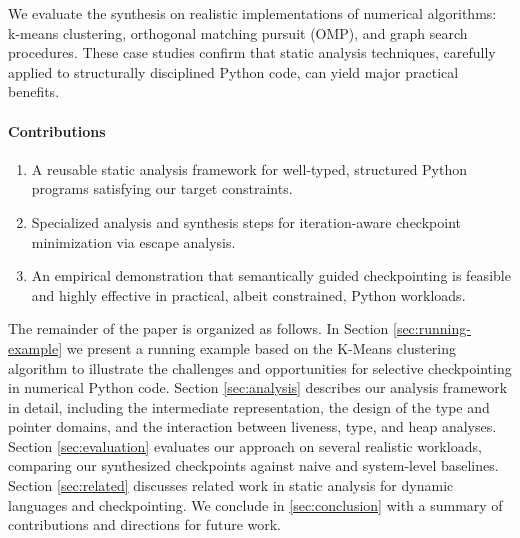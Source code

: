 We evaluate the synthesis on realistic implementations of numerical algorithms: k-means clustering, orthogonal matching pursuit (OMP), and graph search procedures. These case studies confirm that static analysis techniques, carefully applied to structurally disciplined Python code, can yield major practical benefits.

\paragraph{Contributions}
\begin{enumerate}
\item A reusable static analysis framework for well-typed, structured Python programs satisfying our target constraints.
\item Specialized analysis and synthesis steps for iteration-aware checkpoint minimization via escape analysis.
\item An empirical demonstration that semantically guided checkpointing is feasible and highly effective in practical, albeit constrained, Python workloads.
\end{enumerate}

The remainder of the paper is organized as follows. In Section \ref{sec:running-example} we present a running example based on the K-Means clustering algorithm to illustrate the challenges and opportunities for selective checkpointing in numerical Python code. Section \ref{sec:analysis} describes our analysis framework in detail, including the intermediate representation, the design of the type and pointer domains, and the interaction between liveness, type, and heap analyses. Section \ref{sec:evaluation} evaluates our approach on several realistic workloads, comparing our synthesized checkpoints against naive and system-level baselines. Section \ref{sec:related} discusses related work in static analysis for dynamic languages and checkpointing. We conclude in \ref{sec:conclusion} with a summary of contributions and directions for future work.
